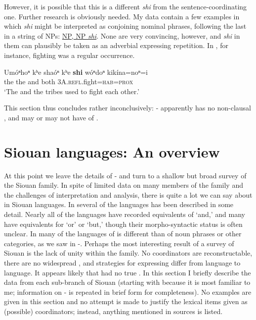 \documentclass[output=paper]{LSP/langsci}
\begin{document}
However, it is possible that this is a different \textit{shi} from the sentence-coordinating one. Further research is obviously needed. My data contain a few examples in which \textit{shi} might be interpreted as conjoining nominal phrases, following the last in a string of NPs:  \underline{NP, NP \textit{shi}}. None are very convincing, however, and \textit{shi} in them can plausibly be taken as an adverbial expressing repetition. In , for instance, fighting was a regular occurrence.

\begin{exe}
\ex\label{ex:rudin:35}
\gll Umóⁿhoⁿ kʰe shaóⁿ kʰe \textbf{shi}  wóⁿdoⁿ 	kikína=noⁿ=i \\
    	the 	  	the 	and both \textsc{3A}.\textsc{refl}.fight=\textsc{hab}=\textsc{prox} \\
\trans `The  and the  tribes used to fight each other.'    
\end{exe}

This section thus concludes rather inconclusively: - apparently has no non-clausal , and may or may not have  of . 

\section{Siouan languages: An overview}\label{sec:rudin:4}

At this point we leave the details of - and turn to a shallow but broad survey of the Siouan family. In spite of limited data on many members of the family and the challenges of interpretation and analysis, there is quite a lot we can say about  in Siouan languages. In several of the languages  has been described in some detail. Nearly all of the languages have recorded equivalents of `and,' and many have equivalents for `or' or `but,' though their morpho-syntactic status is often unclear. In many of the languages  of  is different than  of noun phrases or other categories, as we saw in -. Perhaps the most interesting result of a survey of Siouan  is the lack of unity within the family. No coordinators are reconstructable, there are no widespread , and strategies for expressing  differ from language to language. It appears likely that  had no true . In this section I briefly describe the data from each sub-branch of Siouan (starting with  because it is most familiar to me; information on - is repeated in brief form for completeness). No examples are given in this section and no attempt is made to justify the lexical items given as (possible) coordinators; instead, anything mentioned in sources is listed.
\end{document}

